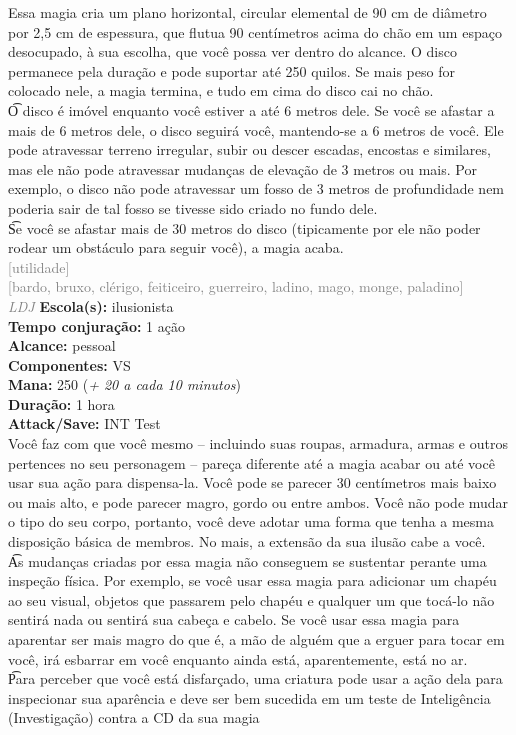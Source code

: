 \documentclass{RPG_Adventure}[2021/10/20]
\begin{document}
{\normalsize Essa magia cria um plano horizontal, circular elemental de 90 cm de diâmetro por 2,5 cm de espessura, que flutua 90 centímetros acima do chão em um espaço desocupado, à sua escolha, que você possa ver dentro do alcance. O disco permanece pela duração e pode suportar até 250 quilos. Se mais peso for colocado nele, a magia termina, e tudo em cima do disco cai no chão.\\\t O disco é imóvel enquanto você estiver a até 6 metros dele. Se você se afastar a mais de 6 metros dele, o disco seguirá você, mantendo-se a 6 metros de você. Ele pode atravessar terreno irregular, subir ou descer escadas, encostas e similares, mas ele não pode atravessar mudanças de elevação de 3 metros ou mais. Por exemplo, o disco não pode atravessar um fosso de 3 metros de profundidade nem poderia sair de tal fosso se tivesse sido criado no fundo dele.\\\t Se você se afastar mais de 30 metros do disco (tipicamente por ele não poder rodear um obstáculo para seguir você), a magia acaba.\\}
{\scriptsize \textcolor{gray}{[utilidade]\\}}
{\scriptsize \textcolor{gray}{[bardo, bruxo, clérigo, feiticeiro, guerreiro, ladino, mago, monge, paladino]\\}}
{\tiny \textcolor{gray}{\textit{LDJ}}}
{\small \t \textbf{Escola(s):} ilusionista\\\t \textbf{Tempo conjuração:} 1 ação\\\t \textbf{Alcance:} pessoal\\\t \textbf{Componentes:} VS\\\t \textbf{Mana:} 250 (\textit{+ 20 a cada 10 minutos})\\\t \textbf{Duração:} 1 hora\\\t \textbf{Attack/Save:} INT Test\\}
{\normalsize Você faz com que você mesmo – incluindo suas roupas, armadura, armas e outros pertences no seu personagem – pareça diferente até a magia acabar ou até você usar sua ação para dispensa-la. Você pode se parecer 30 centímetros mais baixo ou mais alto, e pode parecer magro, gordo ou entre ambos. Você não pode mudar o tipo do seu corpo, portanto, você deve adotar uma forma que tenha a mesma disposição básica de membros. No mais, a extensão da sua ilusão cabe a você.\\\t As mudanças criadas por essa magia não conseguem se sustentar perante uma inspeção física. Por exemplo, se você usar essa magia para adicionar um chapéu ao seu visual, objetos que passarem pelo chapéu e qualquer um que tocá-lo não sentirá nada ou sentirá sua cabeça e cabelo. Se você usar essa magia para aparentar ser mais magro do que é, a mão de alguém que a erguer para tocar em você, irá esbarrar em você enquanto ainda está, aparentemente, está no ar.\\\t Para perceber que você está disfarçado, uma criatura pode usar a ação dela para inspecionar sua aparência e deve ser bem sucedida em um teste de Inteligência (Investigação) contra a CD da sua magia\\}
\end{document}
